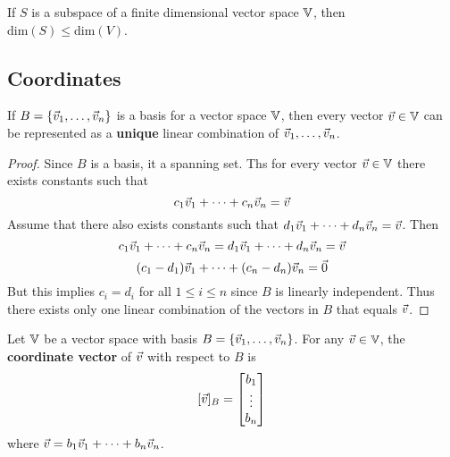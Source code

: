 \documentclass[english, 12pt]{article}
\begin{document}
\begin{cor}
If $S$ is a subspace of a finite dimensional vector space ${\mathbb{V}}$, then $\text{dim}(S) \leq \text{dim}(V)$.
\end{cor}

\subsection{Coordinates}

\begin{thrm}
If $B = \{\vec{v}_1,\dots,\vec{v}_n\}$ is a basis for a vector space ${\mathbb{V}}$, then every vector $\vec{v} \in {\mathbb{V}}$ can be represented as a \textbf{unique} linear combination of $\vec{v}_1,\dots,\vec{v}_n$.
\begin{proof}
Since $B$ is a basis, it a spanning set. Ths for every vector $\vec{v} \in {\mathbb{V}}$ there exists constants such that
\[c_1 \vec{v}_1 + \cdots + c_n \vec{v}_n = \vec{v}\]
Assume that there also exists constants such that $d_1 \vec{v}_1 + \cdots + d_n \vec{v}_n = \vec{v}$. Then
\[c_1 \vec{v}_1 + \cdots + c_n \vec{v}_n = d_1 \vec{v}_1 + \cdots + d_n \vec{v}_n = \vec{v}\]
\[(c_1 - d_1) \vec{v}_1 + \cdots + (c_n - d_n)\vec{v}_n = \vec{0}\]
But this implies $c_i = d_i$ for all $1 \leq i \leq n$ since $B$ is linearly independent. Thus there exists only one linear combination of the vectors in $B$ that equals $\vec{v}$.
\end{proof}
\end{thrm}

\begin{defn}
Let ${\mathbb{V}}$ be a vector space with basis $B = \{\vec{v}_1,\dots,\vec{v}_n\}$. For any $\vec{v} \in {\mathbb{V}}$, the \textbf{coordinate vector} of $\vec{v}$ with respect to $B$ is
\[\lbrack \vec{v} \rbrack_B = \begin{bmatrix} b_{1} \\ \vdots \\ b_{n} \end{bmatrix}\]
where $\vec{v} = b_1\vec{v}_1 + \cdots + b_n\vec{v}_n$.
\end{defn}
\end{document}
